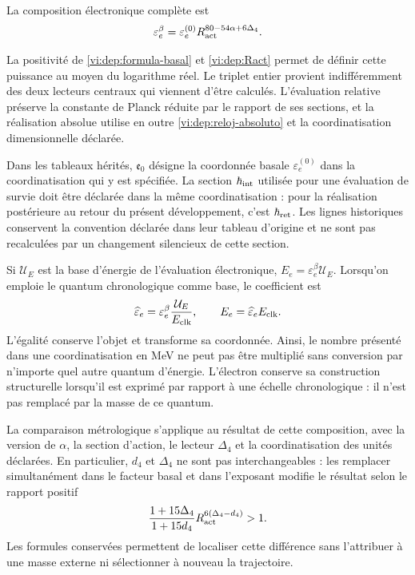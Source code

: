 \begin{definition}
La composition électronique complète est
\begin{equation}
 \varepsilon_e^\beta
  =\varepsilon_e^{(0)}
      R_{\rm act}^{80-54\alpha+6\Delta_4}.
 \label{vi:dep:electron-beta}
\end{equation}
\end{definition}
La positivité de \eqref{vi:dep:formula-basal} et
\eqref{vi:dep:Ract} permet de définir cette puissance au moyen du
logarithme réel. Le triplet entier provient indifféremment des deux
lecteurs centraux qui viennent d’être calculés. L’évaluation relative
préserve la constante de Planck réduite par le rapport de ses
sections, et la réalisation absolue utilise en outre
\eqref{vi:dep:reloj-absoluto} et la coordinatisation dimensionnelle déclarée.

Dans les tableaux hérités, \(\mathfrak e_0\) désigne la
coordonnée basale \(\varepsilon_e^{(0)}\) dans la coordinatisation qui y est
spécifiée. La section \(\hbar_{\rm int}\) utilisée pour une
évaluation de survie doit être déclarée dans la même coordinatisation :
pour la réalisation postérieure au retour du présent développement,
c’est \(\hbar_{\rm ret}\). Les lignes historiques conservent la
convention déclarée dans leur tableau d’origine et ne sont pas recalculées par un
changement silencieux de cette section.

Si \(\mathcal U_E\) est la base d’énergie de l’évaluation
électronique, \(E_e=\varepsilon_e^\beta\mathcal U_E\). Lorsqu’on emploie
le quantum chronologique comme base, le coefficient est
\[
 \widehat\varepsilon_e
   =\varepsilon_e^\beta\frac{\mathcal U_E}{E_{\rm clk}},
 \qquad E_e=\widehat\varepsilon_e E_{\rm clk}.
\]
L’égalité conserve l’objet et transforme sa coordonnée. Ainsi,
le nombre présenté dans une coordinatisation en MeV ne peut pas être multiplié
sans conversion par n’importe quel autre quantum d’énergie. L’électron
conserve sa construction structurelle lorsqu’il est exprimé par rapport à une
échelle chronologique : il n’est pas remplacé par la masse de ce quantum.

La comparaison métrologique s’applique au résultat de cette composition,
avec la version de \(\alpha\), la section d’action, le lecteur
\(\Delta_4\) et la coordinatisation des unités déclarées. En particulier,
\(d_4\) et \(\Delta_4\) ne sont pas interchangeables : les remplacer
simultanément dans le facteur basal et dans l’exposant modifie le
résultat selon le rapport positif
\[
 \frac{1+15\Delta_4}{1+15d_4}
 R_{\rm act}^{6(\Delta_4-d_4)}>1.
\]
Les formules conservées permettent de localiser cette différence sans
l’attribuer à une masse externe ni sélectionner à nouveau la trajectoire.
